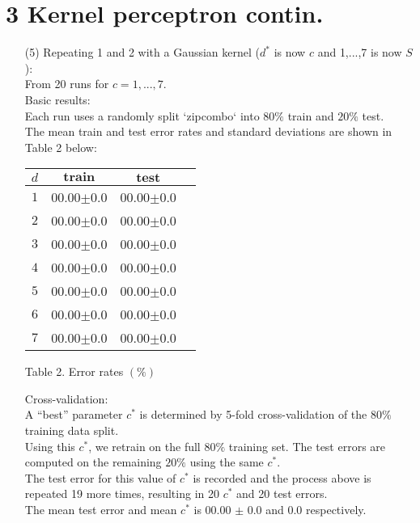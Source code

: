 \documentclass[a4paper,12pt]{article}
\begin{document}
\section*{3 Kernel perceptron contin.}
\begin{enumerate}
\item[(5)] 
Repeating 1 and 2 with a Gaussian kernel  ($d^*$ is now $c$ and {1,...,7} is now $S$):\\
From 20 runs for $c = 1, ... , 7$. \\

Basic results: \\
Each run uses a randomly split `zipcombo` into $80\%$ train and $20\%$ test. \\
The mean train and test error rates and standard deviations are shown in Table 2 below:

\begin{tabular}{|c|c|c|c|}
\hline
$d$&$\textbf{train}$&$\textbf{test}$\\
\hline
$1$&00.00$\pm$0.0&00.00$\pm$0.0\\
\hline
$2$&00.00$\pm$0.0&00.00$\pm$0.0\\
\hline
$3$&00.00$\pm$0.0&00.00$\pm$0.0\\
\hline
$4$&00.00$\pm$0.0&00.00$\pm$0.0\\
\hline
$5$&00.00$\pm$0.0&00.00$\pm$0.0\\
\hline
$6$&00.00$\pm$0.0&00.00$\pm$0.0\\
\hline
$7$&00.00$\pm$0.0&00.00$\pm$0.0\\
\hline
\end{tabular}\par 
Table 2. Error rates $(\%)$

Cross-validation: \\
A “best” parameter $c^*$ is determined by 5-fold cross-validation of the $80\%$ training data split. \\
Using this $c^*$, we retrain on the full $80\%$ training set. The test errors are computed on the remaining $20\%$ using the same $c^*$. \\
The test error for this value of $c^*$ is recorded and the process above is repeated 19 more times, resulting in 20 $c^*$ and 20 test errors.\\
The mean test error and mean $c^*$ is 00.00 $\pm$ 0.0 and 0.0 respectively.



\end{enumerate}
\clearpage
\end{document}
